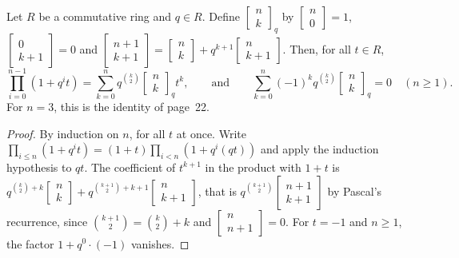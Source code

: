 \begin{encadre}
\begin{theoreme}\label{thm:quillen-1970-15}
Let $R$ be a commutative ring and $q \in R$. Define $\left[\begin{smallmatrix} n \\ k \end{smallmatrix}\right]_q$ by $\left[\begin{smallmatrix} n \\ 0 \end{smallmatrix}\right] = 1$, $\left[\begin{smallmatrix} 0 \\ k + 1 \end{smallmatrix}\right] = 0$ and $\left[\begin{smallmatrix} n + 1 \\ k + 1 \end{smallmatrix}\right] = \left[\begin{smallmatrix} n \\ k \end{smallmatrix}\right] + q^{k+1} \left[\begin{smallmatrix} n \\ k + 1 \end{smallmatrix}\right]$. Then, for all $t \in R$,
\[
\prod_{i = 0}^{n - 1} (1 + q^i t) = \sum_{k = 0}^{n} q^{\binom{k}{2}} \begin{bmatrix} n \\ k \end{bmatrix}_q t^k,
\qquad\text{and}\qquad
\sum_{k = 0}^{n} (-1)^k q^{\binom{k}{2}} \begin{bmatrix} n \\ k \end{bmatrix}_q = 0 \quad (n \ge 1).
\]
For $n = 3$, this is the identity of page~22.
\end{theoreme}
\end{encadre}

\begin{proof}
By induction on $n$, for all $t$ at once. Write $\prod_{i \le n}(1 + q^i t) = (1 + t) \prod_{i < n}(1 + q^i (qt))$ and apply the induction hypothesis to $qt$. The coefficient of $t^{k+1}$ in the product with $1 + t$ is $q^{\binom{k}{2} + k}\left[\begin{smallmatrix} n \\ k \end{smallmatrix}\right] + q^{\binom{k+1}{2} + k + 1}\left[\begin{smallmatrix} n \\ k + 1 \end{smallmatrix}\right]$, that is $q^{\binom{k+1}{2}}\left[\begin{smallmatrix} n + 1 \\ k + 1 \end{smallmatrix}\right]$ by Pascal's recurrence, since $\binom{k+1}{2} = \binom{k}{2} + k$ and $\left[\begin{smallmatrix} n \\ n + 1 \end{smallmatrix}\right] = 0$. For $t = -1$ and $n \ge 1$, the factor $1 + q^0 \cdot (-1)$ vanishes.
\end{proof}

